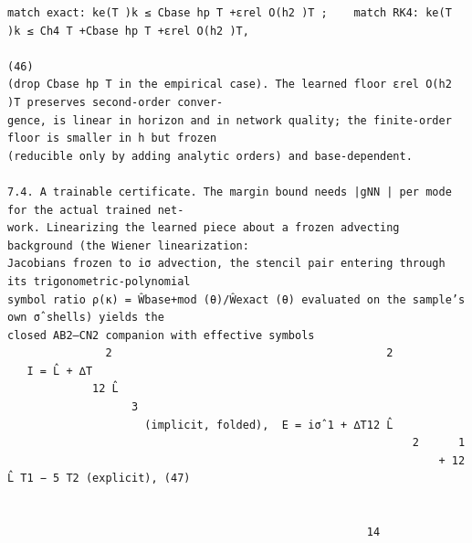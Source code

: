 \documentclass[letterpaper]{article}
\begin{document}
\begin{Verbatim}[fontsize=\fontsize{6.35}{7.15}\selectfont,breaklines=false]
match exact: ke(T )k ≤ Cbase hp T +εrel O(h2 )T ;    match RK4: ke(T )k ≤ Ch4 T +Cbase hp T +εrel O(h2 )T,
                                                                                                 (46)
(drop Cbase hp T in the empirical case). The learned floor εrel O(h2 )T preserves second-order conver-
gence, is linear in horizon and in network quality; the finite-order floor is smaller in h but frozen
(reducible only by adding analytic orders) and base-dependent.

7.4. A trainable certificate. The margin bound needs |gNN | per mode for the actual trained net-
work. Linearizing the learned piece about a frozen advecting background (the Wiener linearization:
Jacobians frozen to iσ advection, the stencil pair entering through its trigonometric-polynomial
symbol ratio ρ(κ) = Ŵbase+mod (θ)/Ŵexact (θ) evaluated on the sample’s own σ̂ shells) yields the
closed AB2–CN2 companion with effective symbols
               2                                          2                       
   I = L̂ + ∆T
             12 L̂
                   3
                     (implicit, folded),  E = iσ̂ 1 + ∆T12 L̂
                                                              2      1
                                                                  + 12 L̂ T1 − 5 T2 (explicit), (47)


                                                       14
\end{Verbatim}
\newpage
\end{document}
